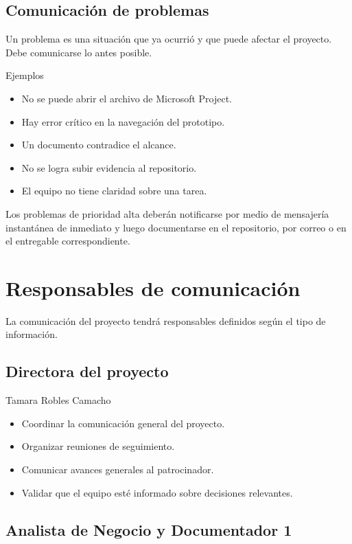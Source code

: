 \documentclass[11pt,spanish]{article}
\begin{document}
\subsection{Comunicación de problemas}

Un problema es una situación que ya ocurrió y que puede afectar el proyecto. Debe comunicarse lo antes posible.

\noindent Ejemplos

\begin{itemize}
    \item No se puede abrir el archivo de Microsoft Project.
    \item Hay error crítico en la navegación del prototipo.
    \item Un documento contradice el alcance.
    \item No se logra subir evidencia al repositorio.
    \item El equipo no tiene claridad sobre una tarea.
\end{itemize}

Los problemas de prioridad alta deberán notificarse por medio de mensajería instantánea de inmediato y luego documentarse en el repositorio, por correo o en el entregable correspondiente.

\section{Responsables de comunicación}

La comunicación del proyecto tendrá responsables definidos según el tipo de información.

\subsection{Directora del proyecto}

Tamara Robles Camacho

\begin{itemize}
    \item Coordinar la comunicación general del proyecto.
    \item Organizar reuniones de seguimiento.
    \item Comunicar avances generales al patrocinador.
    \item Validar que el equipo esté informado sobre decisiones relevantes.
\end{itemize}

\subsection{Analista de Negocio y Documentador 1}
\end{document}
